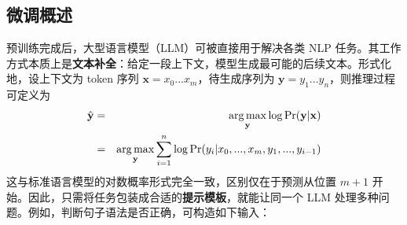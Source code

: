 





\subsection{微调概述}

\noindent 预训练完成后，大型语言模型（LLM）可被直接用于解决各类 NLP 任务。其工作方式本质上是\textbf{文本补全}：给定一段上下文，模型生成最可能的后续文本。形式化地，设上下文为 token 序列 $\mathbf{x}=x_0...x_m$，待生成序列为 $\mathbf{y}=y_1...y_n$，则推理过程可定义为
\begin{eqnarray}
\hat{\mathbf{y}} & = & \operatorname*{arg\,max}_{\mathbf{y}} \log \Pr(\mathbf{y} | \mathbf{x}) \nonumber \\
                 & = & \operatorname*{arg\,max}_{\mathbf{y}} \sum_{i=1}^{n} \log \Pr(y_i|x_0,...,x_m,y_1,...,y_{i-1}) \label{eq:inf}
\end{eqnarray}
这与标准语言模型的对数概率形式完全一致，区别仅在于预测从位置 $m+1$ 开始。因此，只需将任务包装成合适的\textbf{提示模板}，就能让同一个 LLM 处理多种问题。例如，判断句子语法是否正确，可构造如下输入：

